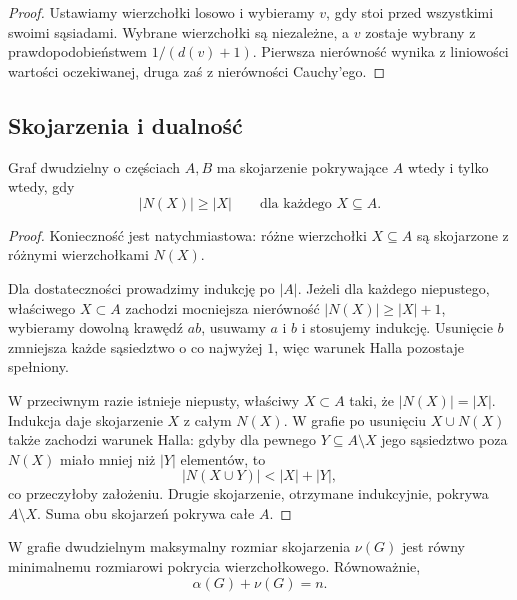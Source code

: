 \documentclass{lecture-kuznia}
\newenvironment{theoryproof}{\begin{proof}}{\end{proof}}
\begin{document}
\begin{theoryproof}
	Ustawiamy wierzchołki losowo i wybieramy $v$, gdy stoi przed wszystkimi
	swoimi sąsiadami. Wybrane wierzchołki są niezależne, a $v$ zostaje wybrany
	z prawdopodobieństwem $1/(d(v)+1)$. Pierwsza nierówność wynika z liniowości
	wartości oczekiwanej, druga zaś z nierówności Cauchy'ego.
\end{theoryproof}

\subsection{Skojarzenia i dualność}

\begin{theorem}[Hall]
	Graf dwudzielny o częściach $A,B$ ma skojarzenie pokrywające $A$ wtedy i
	tylko wtedy, gdy
	\[
		|N(X)|\geqslant|X|\qquad\text{dla każdego }X\subseteq A.
	\]
\end{theorem}

\begin{theoryproof}
	Konieczność jest natychmiastowa: różne wierzchołki $X\subseteq A$ są
	skojarzone z różnymi wierzchołkami $N(X)$.

	Dla dostateczności prowadzimy indukcję po $|A|$. Jeżeli dla każdego
	niepustego, właściwego $X\subset A$ zachodzi mocniejsza nierówność
	$|N(X)|\geqslant|X|+1$, wybieramy dowolną krawędź $ab$, usuwamy $a$ i $b$
	i stosujemy indukcję. Usunięcie $b$ zmniejsza każde sąsiedztwo o co najwyżej
	$1$, więc warunek Halla pozostaje spełniony.

	W przeciwnym razie istnieje niepusty, właściwy $X\subset A$ taki, że
	$|N(X)|=|X|$. Indukcja daje skojarzenie $X$ z całym $N(X)$. W grafie po
	usunięciu $X\cup N(X)$ także zachodzi warunek Halla: gdyby dla pewnego
	$Y\subseteq A\setminus X$ jego sąsiedztwo poza $N(X)$ miało mniej niż
	$|Y|$ elementów, to
	\[
		|N(X\cup Y)|<|X|+|Y|,
	\]
	co przeczyłoby założeniu. Drugie skojarzenie, otrzymane indukcyjnie, pokrywa
	$A\setminus X$. Suma obu skojarzeń pokrywa całe $A$.
\end{theoryproof}

\begin{theorem}[Kőnig]
	W grafie dwudzielnym maksymalny rozmiar skojarzenia $\nu(G)$ jest równy
	minimalnemu rozmiarowi pokrycia wierzchołkowego. Równoważnie,
	\[
		\alpha(G)+\nu(G)=n.
	\]
\end{theorem}
\end{document}
